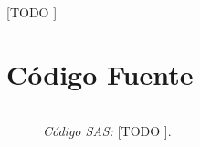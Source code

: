 \documentclass{article}
\begin{document}
    \paragraph{}
    [TODO ]


  \part{Código Fuente}

    \begin{figure}[!h]
      \centering
      \begin{verbatim}

      \end{verbatim}
      \caption{\emph{Código SAS:} [TODO ].}
      \label{code:sas_1}
    \end{figure}

  \nocite{rano2017}
  \nocite{sas}
  \nocite{neter1996applied}
  \nocite{montgomery2012introduction}

  
  
\end{document}
